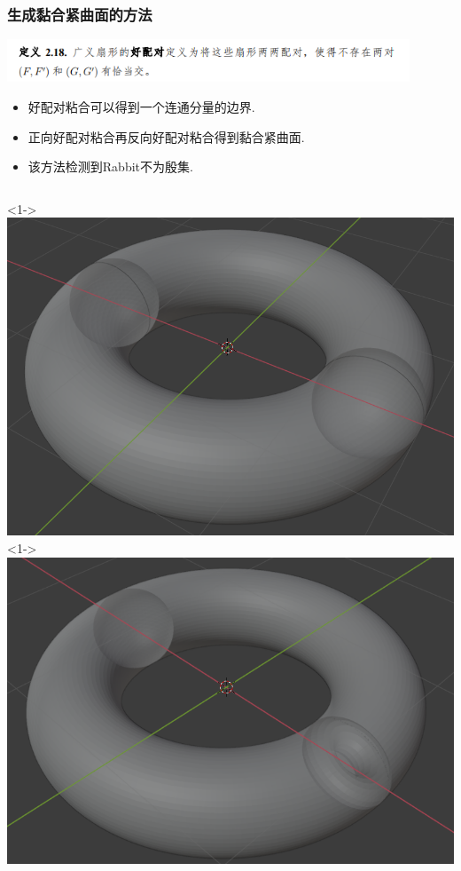 \documentclass[UTF8]{ctexbeamer}	%
\theoremstyle{plain}
\theoremstyle{definition}
\theoremstyle{remark}
\numberwithin{equation}{section}
\begin{document}
\begin{frame}
    \frametitle{生成黏合紧曲面的方法}
    \begin{center}
        \includegraphics[width = 0.9\textwidth]{fig/goodpair.png}
    \end{center}
    \vspace{-0.1in}
    \begin{itemize}
        \item 好配对粘合可以得到一个连通分量的边界.
        \item 正向好配对粘合再反向好配对粘合得到黏合紧曲面.
        \item 该方法检测到Rabbit不为殷集.
    \end{itemize}
     \begin{columns}
        <1->
        \includegraphics[width = \textwidth]{fig/s3.png}
        <1->
        \includegraphics[width = \textwidth]{fig/s31.png}
    \end{columns}
\end{frame}
\end{document}
